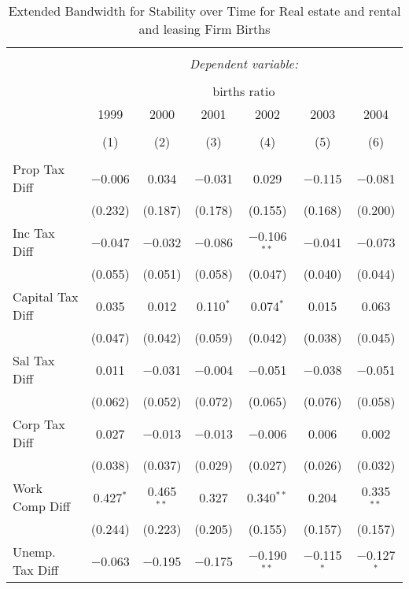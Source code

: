 
\begin{table}[!htbp] \centering 
  \caption{Extended Bandwidth for Stability over Time for  Real estate and rental and leasing Firm Births} 
  \label{53 ebyear} 
\small 
\begin{tabular}{@{\extracolsep{5pt}}lcccccc} 
\\[-1.8ex]\hline 
\hline \\[-1.8ex] 
 & \multicolumn{6}{c}{\textit{Dependent variable:}} \\ 
\cline{2-7} 
\\[-1.8ex] & \multicolumn{6}{c}{births ratio} \\ 
 & 1999 & 2000 & 2001 & 2002 & 2003 & 2004 \\ 
\\[-1.8ex] & (1) & (2) & (3) & (4) & (5) & (6)\\ 
\hline \\[-1.8ex] 
 Prop Tax Diff & $-$0.006 & 0.034 & $-$0.031 & 0.029 & $-$0.115 & $-$0.081 \\ 
  & (0.232) & (0.187) & (0.178) & (0.155) & (0.168) & (0.200) \\ 
  Inc Tax Diff & $-$0.047 & $-$0.032 & $-$0.086 & $-$0.106$^{**}$ & $-$0.041 & $-$0.073 \\ 
  & (0.055) & (0.051) & (0.058) & (0.047) & (0.040) & (0.044) \\ 
  Capital Tax Diff & 0.035 & 0.012 & 0.110$^{*}$ & 0.074$^{*}$ & 0.015 & 0.063 \\ 
  & (0.047) & (0.042) & (0.059) & (0.042) & (0.038) & (0.045) \\ 
  Sal Tax Diff & 0.011 & $-$0.031 & $-$0.004 & $-$0.051 & $-$0.038 & $-$0.051 \\ 
  & (0.062) & (0.052) & (0.072) & (0.065) & (0.076) & (0.058) \\ 
  Corp Tax Diff & 0.027 & $-$0.013 & $-$0.013 & $-$0.006 & 0.006 & 0.002 \\ 
  & (0.038) & (0.037) & (0.029) & (0.027) & (0.026) & (0.032) \\ 
  Work Comp Diff & 0.427$^{*}$ & 0.465$^{**}$ & 0.327 & 0.340$^{**}$ & 0.204 & 0.335$^{**}$ \\ 
  & (0.244) & (0.223) & (0.205) & (0.155) & (0.157) & (0.157) \\ 
  Unemp. Tax Diff & $-$0.063 & $-$0.195 & $-$0.175 & $-$0.190$^{**}$ & $-$0.115$^{*}$ & $-$0.127$^{*}$ \\ 

\end{tabular}
\end{table}
